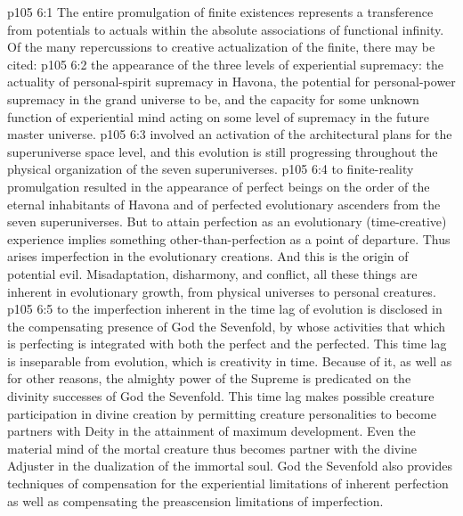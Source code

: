 \vs p105 6:1 The entire promulgation of finite existences represents a transference from potentials to actuals within the absolute associations of functional infinity. Of the many repercussions to creative actualization of the finite, there may be cited:
\vs p105 6:2 \bibnobreakspace {} the appearance of the three levels of experiential supremacy: the actuality of personal\hyp{}spirit supremacy in Havona, the potential for personal\hyp{}power supremacy in the grand universe to be, and the capacity for some unknown function of experiential mind acting on some level of supremacy in the future master universe.
\vs p105 6:3 \bibnobreakspace {} involved an activation of the architectural plans for the superuniverse space level, and this evolution is still progressing throughout the physical organization of the seven superuniverses.
\vs p105 6:4 \bibnobreakspace {} to finite\hyp{}reality promulgation resulted in the appearance of perfect beings on the order of the eternal inhabitants of Havona and of perfected evolutionary ascenders from the seven superuniverses. But to attain perfection as an evolutionary (time\hyp{}creative) experience implies something other\hyp{}than\hyp{}perfection as a point of departure. Thus arises imperfection in the evolutionary creations. And this is the origin of potential evil. Misadaptation, disharmony, and conflict, all these things are inherent in evolutionary growth, from physical universes to personal creatures.
\vs p105 6:5 \bibnobreakspace {} to the imperfection inherent in the time lag of evolution is disclosed in the compensating presence of God the Sevenfold, by whose activities that which is perfecting is integrated with both the perfect and the perfected. This time lag is inseparable from evolution, which is creativity in time. Because of it, as well as for other reasons, the almighty power of the Supreme is predicated on the divinity successes of God the Sevenfold. This time lag makes possible creature participation in divine creation by permitting creature personalities to become partners with Deity in the attainment of maximum development. Even the material mind of the mortal creature thus becomes partner with the divine Adjuster in the dualization of the immortal soul. God the Sevenfold also provides techniques of compensation for the experiential limitations of inherent perfection as well as compensating the preascension limitations of imperfection.
